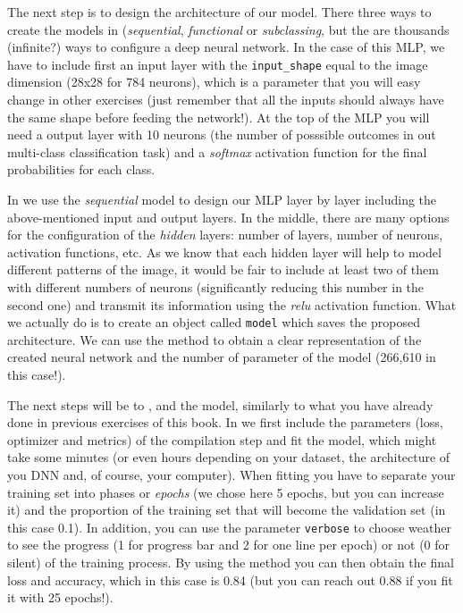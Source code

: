 
The next step is to design the architecture of our model. There three ways to create the models in  (\textit{sequential}, \textit{functional} or \textit{subclassing}, but the are thousands (infinite?) ways to configure a deep neural network. In the case of this MLP, we have to include first an input layer with the \texttt{input\_shape} equal to the image dimension (28x28 for 784 neurons), which is a parameter that you will easy change in other exercises (just remember that all the inputs should always have the same shape before feeding the network!). At the top of the MLP you will  need a output layer with 10 neurons (the number of posssible outcomes in out multi-class classification task) and a \textit{softmax} activation function for the final probabilities for each class.

In  we use the \textit{sequential} model to design our MLP layer by layer including the above-mentioned input and output layers. In the middle, there are many options for the configuration of the \textit{hidden} layers: number of layers, number of neurons, activation functions, etc. As we know that each hidden layer will help to model different patterns of the image, it would be fair to include at least two of them with different numbers of neurons (significantly reducing this number in the second one) and transmit its information using the \textit{relu} activation function. What we actually do is to create an object called \texttt{model} which saves the proposed architecture. We can use the method  to obtain a clear representation of the created neural network and the number of parameter of the model (266,610 in this case!).


The next steps will be to ,  and  the model, similarly to what you have already done in previous exercises of this book. In  we first include the parameters (loss, optimizer and metrics) of the compilation step and fit the model, which might take some minutes (or even hours depending on your dataset, the architecture of you DNN and, of course, your computer). When fitting you have to separate your training set into phases or \textit{epochs} (we chose here 5 epochs, but you can increase it) and the proportion of the training set that will become the validation set (in this case 0.1). In addition, you can use the parameter \texttt{verbose} to choose weather to see the progress (1 for progress bar and 2 for one line per epoch) or not (0 for silent) of the training process. By using the method you can then obtain the final loss and accuracy, which in this case is 0.84 (but you can reach out 0.88 if you fit it with 25 epochs!).

